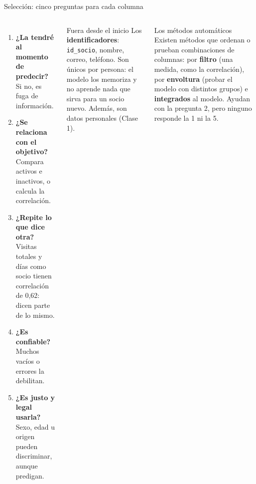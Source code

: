 \documentclass[aspectratio=169,11pt]{beamer}
\begin{document}
\begin{frame}[t]{Selección: cinco preguntas para cada columna}
  \begin{columns}[T,onlytextwidth]
    \small
    \begin{enumerate}
      \small
      \item \textbf{¿La tendré al momento de predecir?} Si no, es fuga de
        información.
      \item \textbf{¿Se relaciona con el objetivo?} Compara activos e
        inactivos, o calcula la correlación.
      \item \textbf{¿Repite lo que dice otra?} Visitas totales y días como
        socio tienen correlación de 0,62: dicen parte de lo mismo.
      \item \textbf{¿Es confiable?} Muchos vacíos o errores la debilitan.
      \item \textbf{¿Es justo y legal usarla?} Sexo, edad u origen pueden
        discriminar, aunque predigan.
    \end{enumerate}
    \begin{alertblock}{Fuera desde el inicio}
      \footnotesize Los \textbf{identificadores}: \texttt{id\_socio},
      nombre, correo, teléfono. Son únicos por persona: el modelo los
      memoriza y no aprende nada que sirva para un socio nuevo. Además,
      son datos personales (Clase 1).
    \end{alertblock}
    \begin{block}{Los métodos automáticos}
      \footnotesize Existen métodos que ordenan o prueban combinaciones de
      columnas: por \textbf{filtro} (una medida, como la correlación), por
      \textbf{envoltura} (probar el modelo con distintos grupos) e
      \textbf{integrados} al modelo. Ayudan con la pregunta 2, pero
      ninguno responde la 1 ni la 5.
    \end{block}
  \end{columns}
\end{frame}
\end{document}
